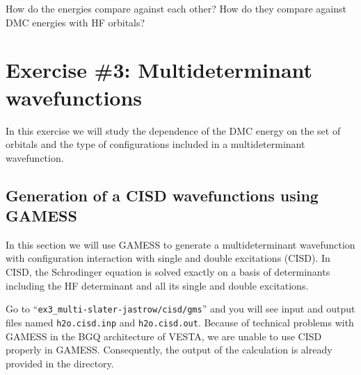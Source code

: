 How do the energies compare against each other? How do they compare against DMC
energies with HF orbitals?
\section{Exercise \#3: Multideterminant wavefunctions}
In this exercise we will study the dependence of the DMC energy on the set of orbitals
and the type of configurations included in a multideterminant wavefunction. 

\subsection{Generation of a CISD wavefunctions using GAMESS}
In this section we will use GAMESS to generate a multideterminant wavefunction with
configuration interaction with single and double excitations (CISD). In CISD, the Schrodinger equation is solved exactly on a basis of determinants 
including the HF determinant and all its single and double excitations. 

Go to ``\texttt{ex3\_multi-slater-jastrow/cisd/gms}'' and you will see input and output files named \texttt{h2o.cisd.inp} and \texttt{h2o.cisd.out}. Because of technical problems with GAMESS in the BGQ architecture of VESTA, we are unable to use CISD properly in GAMESS. Consequently, the output of the calculation is already provided in the directory. 


